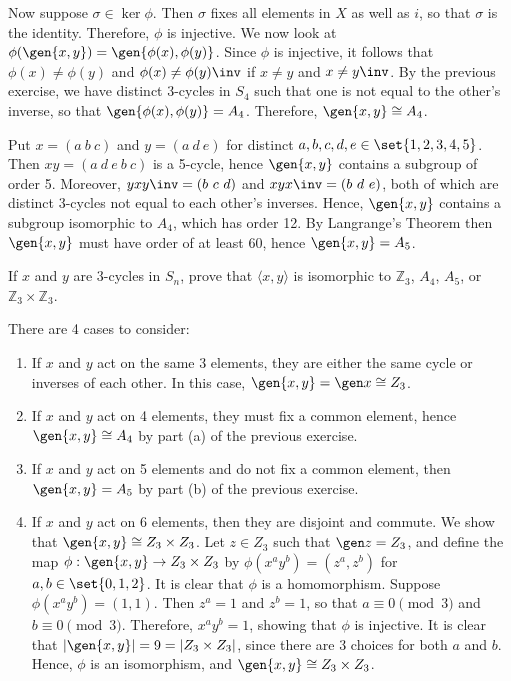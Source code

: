 \begin{problems}
\begin{solalph}
        Now suppose $\sigma \in \ker\phi$. Then $\sigma$ fixes all elements in $X$ as well as $i$, so that $\sigma$ is the identity. Therefore, $\phi$ is injective. We now look at $\phi(\gen{x, y}) = \gen{\phi(x), \phi(y)}$. Since $\phi$ is injective, it follows that $\phi(x) \neq \phi(y)$ and $\phi(x) \neq \phi(y)\inv$ if $x \neq y$ and $x \neq y\inv$. By the previous exercise, we have distinct 3-cycles in $S_4$ such that one is not equal to the other's inverse, so that $\gen{\phi(x), \phi(y)} = A_4$. Therefore, $\gen{x, y} \cong A_4$.
        \item Put $x = (a\ b\ c)$ and $y = (a\ d\ e)$ for distinct $a, b, c, d, e \in \set{1, 2, 3, 4, 5}$. Then $xy = (a\ d\ e\ b\ c)$ is a 5-cycle, hence $\gen{x, y}$ contains a subgroup of order 5. Moreover, $yxy\inv = (b\ c\ d)$ and $xyx\inv = (b\ d\ e)$, both of which are distinct 3-cycles not equal to each other's inverses. Hence, $\gen{x, y}$ contains a subgroup isomorphic to $A_4$, which has order 12. By Langrange's Theorem then $\gen{x, y}$ must have order of at least 60, hence $\gen{x, y} = A_5$.
    \end{solalph}
    \item If $x$ and $y$ are $3$-cycles in $S_n$, prove that $\langle x,y\rangle$ is isomorphic to $\mathbb{Z}_3$, $A_4$, $A_5$, or $\mathbb{Z}_3\times\mathbb{Z}_3$.
    \begin{sol}
        There are 4 cases to consider:
        \begin{enumerate}
            \item If $x$ and $y$ act on the same 3 elements, they are either the same cycle or inverses of each other. In this case, $\gen{x, y} = \gen x \cong Z_3$.
            \item If $x$ and $y$ act on 4 elements, they must fix a common element, hence $\gen{x, y} \cong A_4$ by part (a) of the previous exercise.
            \item If $x$ and $y$ act on 5 elements and do not fix a common element, then $\gen{x, y} = A_5$ by part (b) of the previous exercise.
            \item If $x$ and $y$ act on 6 elements, then they are disjoint and commute. We show that $\gen{x, y} \cong Z_3 \times Z_3$. Let $z \in Z_3$ such that $\gen z = Z_3$, and define the map $\phi : \gen{x, y} \to Z_3 \times Z_3$ by $\phi(x^a y^b) = (z^a, z^b)$ for $a, b \in \set{0, 1, 2}$. It is clear that $\phi$ is a homomorphism. Suppose $\phi(x^a y^b) = (1, 1)$. Then $z^a = 1$ and $z^b = 1$, so that $a \equiv 0 \pmod 3$ and $b \equiv 0 \pmod 3$. Therefore, $x^a y^b = 1$, showing that $\phi$ is injective. It is clear that $|\gen{x, y}| = 9 = |Z_3 \times Z_3|$, since there are 3 choices for both $a$ and $b$. Hence, $\phi$ is an isomorphism, and $\gen{x, y} \cong Z_3 \times Z_3$. \qh
        \end{enumerate}
    \end{sol}
\end{problems}
